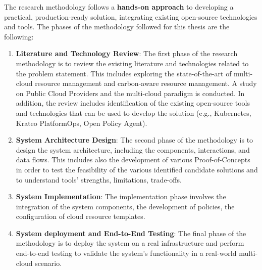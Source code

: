 

The research methodology follows a \textbf{hands-on approach} to developing a practical, production-ready solution, integrating existing open-source technologies and tools.
The phases of the methodology followed for this thesis are the following:
\begin{enumerate}
    \item \textbf{Literature and Technology Review}: The first phase of the research methodology is to review the existing literature and technologies related to the problem statement. 
    This includes exploring the state-of-the-art of multi-cloud resource management and carbon-aware resource management.
    A study on Public Cloud Providers and the multi-cloud paradigm is conducted.
    In addition, the review includes identification of the existing open-source tools and technologies that can be used to develop the solution (e.g., Kubernetes, Krateo PlatformOps, Open Policy Agent).
    \item \textbf{System Architecture Design}: The second phase of the methodology is to design the system architecture, including the components, interactions, and data flows.
    This includes also the development of various Proof-of-Concepts in order to test the feasibility of the various identified candidate solutions and to understand tools' strengths, limitations, trade-offs.
    \item \textbf{System Implementation}: The implementation phase involves the integration of the system components, the development of policies, the configuration of cloud resource templates.
    \item \textbf{System deployment and End-to-End Testing}: The final phase of the methodology is to deploy the system on a real infrastructure and perform end-to-end testing to validate the system's functionality in a real-world multi-cloud scenario.
\end{enumerate}



